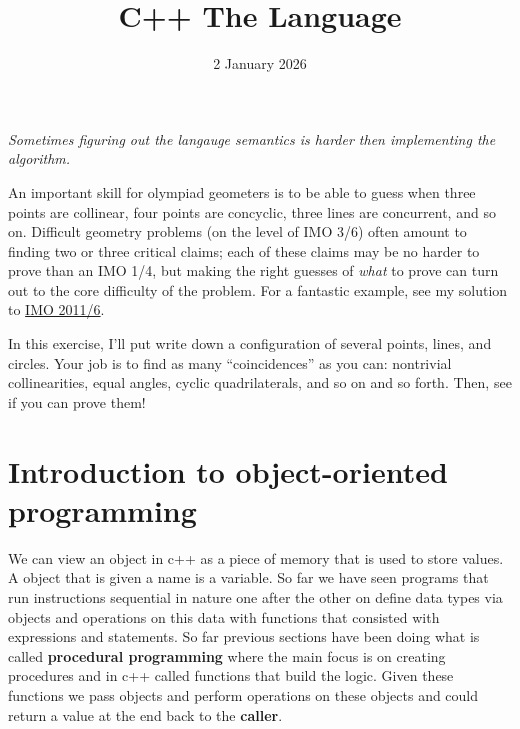 \documentclass[11pt]{scrartcl}
\begin{document}
\title{C++ The Language}
\date{2 January 2026}
\maketitle

\begin{center}
  \itshape
  Sometimes figuring out the langauge semantics is harder then implementing the algorithm.
\end{center}

An important skill for olympiad geometers is to be able to guess when three points are collinear,
four points are concyclic, three lines are concurrent, and so on.
Difficult geometry problems (on the level of IMO 3/6) often amount to finding two or three critical claims;
each of these claims may be no harder to prove than an IMO 1/4, but making the right guesses of \emph{what} to prove
can turn out to the core difficulty of the problem.
For a fantastic example, see my solution to
\href{http://www.aops.com/community/c6h418983p3518149}{IMO 2011/6}.

In this exercise, I'll put write down a configuration of several points, lines, and circles.
Your job is to find as many ``coincidences'' as you can: nontrivial collinearities, equal angles,
cyclic quadrilaterals, and so on and so forth.
Then, see if you can prove them!

\tableofcontents

\section{Introduction to object-oriented programming}
We can view an object in c++ as a piece of memory that is used to store values. A object that is given a name is a variable. So
far we have seen programs that run instructions sequential in nature one after the other on define data types via objects and operations on this data
with functions that consisted with expressions and statements. So far previous sections have been doing what is called \textbf{procedural programming} where the main
focus is on creating procedures and in c++ called functions that build the logic. Given these functions we pass objects and perform operations on these 
objects and could return a value at the end back to the \textbf{caller}.
\end{document}
